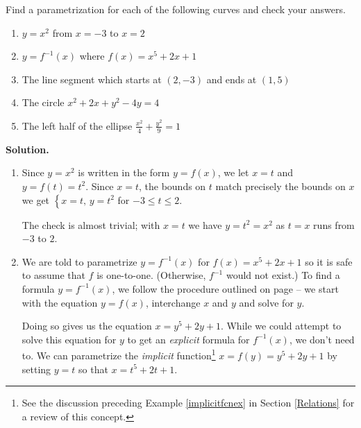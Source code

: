 \documentclass{ximera}
\begin{document}
\begin{ex} \label{recttoparametric}  Find a parametrization for each of the following curves and check your answers.

\begin{enumerate}

\item $y = x^2$ from $x = -3$ to $x = 2$

\item  $y = f^{-1}(x)$ where $f(x) = x^5 + 2x + 1$

\item  The line segment which starts at $(2,-3)$ and ends at $(1,5)$

\item  The circle $x^2 + 2x + y^2 - 4y = 4$

\item  The left half of the ellipse $\frac{x^2}{4} + \frac{y^2}{9} = 1$

\end{enumerate}

{\bf Solution.} 

\begin{enumerate}

\item  Since $y = x^2$ is written in the form $y = f(x)$, we let $x = t$ and $y = f(t) = t^2$.  Since $x=t$, the bounds on $t$ match precisely the bounds on $x$  we get $\left\{ x = t, \, y = t^2 \right.$ for $-3 \leq t \leq 2$.  

\smallskip

The check is almost trivial; with $x=t$ we have $y = t^2 = x^2$ as $t = x$ runs from $-3$ to $2$.

\item  We are told to parametrize $y = f^{-1}(x)$ for $f(x) = x^5 + 2x + 1$ so it is safe to assume that $f$ is one-to-one.  (Otherwise, $f^{-1}$ would not exist.)  To find a formula $y = f^{-1}(x)$, we  follow the procedure outlined on page \pageref{inverseprocedure} -- we start with the equation $y = f(x)$, interchange $x$ and $y$ and solve for $y$.  

\smallskip

Doing so gives us the equation $x = y^5+2y+1$.  While we could attempt to solve this equation for $y$ to get an \textit{explicit} formula for $f^{-1}(x)$, we don't need to.  We can parametrize the \textit{implicit} function\footnote{See the discussion preceding Example \ref{implicitfcnex} in Section \ref{Relations} for a review of this concept.}  $x = f(y) = y^5+2y+1$ by setting $y = t$ so that $x = t^5 + 2t + 1$.  


\end{enumerate}
\end{ex}
\end{document}
